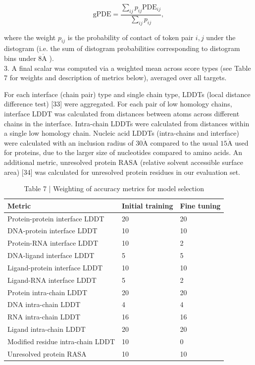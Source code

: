 \documentclass[10pt]{article}
\def\AA{\mathring{\mathrm{A}}}
\begin{document}
\begin{equation*}
\mathrm{gPDE}=\frac{\sum_{i j} p_{i j} \mathrm{PDE}_{i j}}{\sum_{i j} p_{i j}}, \tag{16}
\end{equation*}


where the weight $p_{i j}$ is the probability of contact of token pair $i, j$ under the distogram (i.e. the sum of distogram probabilities corresponding to distogram bins under $8 \AA$ ).\\
3. A final scalar was computed via a weighted mean across score types (see Table 7 for weights and description of metrics below), averaged over all targets.

For each interface (chain pair) type and single chain type, LDDTs (local distance difference test) [33] were aggregated. For each pair of low homology chains, interface LDDT was calculated from distances between atoms across different chains in the interface. Intra-chain LDDTs were calculated from distances within a single low homology chain. Nucleic acid LDDTs (intra-chains and interface) were calculated with an inclusion radius of $30 \AA$ compared to the usual $15 \AA$ used for proteins, due to the larger size of nucleotides compared to amino acids. An additional metric, unresolved protein RASA (relative solvent accessible surface area) [34] was calculated for unresolved protein residues in our evaluation set.

\begin{table}[h]
\begin{center}
\captionsetup{labelformat=empty}
\caption{Table 7 | Weighting of accuracy metrics for model selection}
\begin{tabular}{|l|l|l|}
\hline
Metric & Initial training & Fine tuning \\
\hline
Protein-protein interface LDDT & 20 & 20 \\
\hline
DNA-protein interface LDDT & 10 & 10 \\
\hline
Protein-RNA interface LDDT & 10 & 2 \\
\hline
DNA-ligand interface LDDT & 5 & 5 \\
\hline
Ligand-protein interface LDDT & 10 & 10 \\
\hline
Ligand-RNA interface LDDT & 5 & 2 \\
\hline
Protein intra-chain LDDT & 20 & 20 \\
\hline
DNA intra-chain LDDT & 4 & 4 \\
\hline
RNA intra-chain LDDT & 16 & 16 \\
\hline
Ligand intra-chain LDDT & 20 & 20 \\
\hline
Modified residue intra-chain LDDT & 10 & 0 \\
\hline
Unresolved protein RASA & 10 & 10 \\
\hline
\end{tabular}
\end{center}
\end{table}
\end{document}
